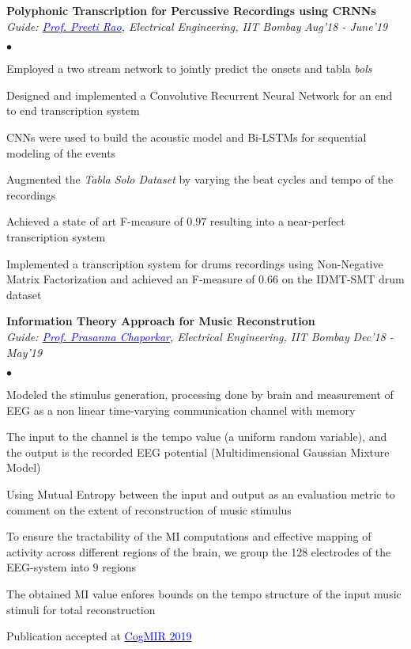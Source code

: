 \documentclass[margin,line]{res}
\newenvironment{list2}{
  \begin{list}{$\bullet$}{%
      \setlength{\itemsep}{0.03in}
      \setlength{\parsep}{0in} \setlength{\parskip}{0in}
      \setlength{\topsep}{0in} \setlength{\partopsep}{0in} 
      \setlength{\leftmargin}{0.2in}}}{\end{list}}
\begin{document}
\begin{resume}
{\bf Polyphonic Transcription for Percussive Recordings using CRNNs} \\
{\em Guide: \href{https://www.ee.iitb.ac.in/wiki/faculty/prao}{\textcolor{blue}{Prof. Preeti Rao}}, Electrical Engineering, IIT Bombay} \hfill {\it Aug'18 - June'19}\\
\vspace*{-.13in}
\begin{list2}
\item Employed a two stream network to jointly predict the onsets and tabla \textit{bols}
\item Designed and implemented a Convolutive Recurrent Neural Network for an end to end transcription system
\item CNNs were used to build the acoustic model and Bi-LSTMs for sequential modeling of the events
\item Augmented the \textit{Tabla Solo Dataset} by varying the beat cycles and tempo of the recordings
\item Achieved a state of art F-measure of $0.97$ resulting into a near-perfect transcription system
\item Implemented a transcription system for drums recordings using Non-Negative Matrix Factorization and achieved an F-measure of $0.66$ on the IDMT-SMT drum dataset
\end{list2}

{\bf Information Theory Approach for Music Reconstrution} \\
{\em Guide: \href{https://www.ee.iitb.ac.in/wiki/faculty/chaporkar}{\textcolor{blue}{Prof. Prasanna Chaporkar}}, Electrical Engineering, IIT Bombay} \hfill {\it Dec'18 - May'19}\\
\vspace*{-.13in}
\begin{list2}
\item Modeled the stimulus generation, processing done by brain and measurement of EEG as a non linear time-varying communication channel with memory
\item The input to the channel is the tempo value (a uniform random variable), and the output is the recorded EEG potential (Multidimensional Gaussian Mixture Model)
\item Using Mutual Entropy between the input and output as an evaluation metric to comment on the extent of reconstruction of music stimulus
\item To ensure the tractability of the MI computations and effective mapping of activity across different regions of the brain, we group the 128 electrodes of the EEG-system into $9$ regions
\item The obtained MI value enfores bounds on the tempo structure of the input music stimuli for total reconstruction
\item Publication accepted at \href{http://www.cogmir.org}{\textcolor{blue} {CogMIR 2019}}
\end{list2}



\end{resume}
\end{document}
